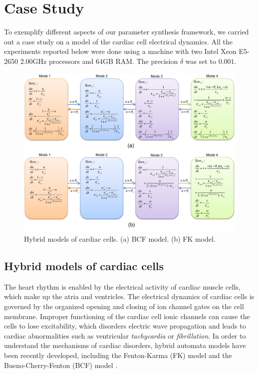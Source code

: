 \section{Case Study}

To exemplify different aspects of our parameter synthesis framework, we carried out a case study on
a model of the cardiac cell electrical dynamics. All the experiments reported below were done
using a machine with two Intel Xeon E5-2650 2.00GHz processors and 64GB RAM. The precision $\delta$
was set to $0.001$.

\begin{figure}[t]
\centering
\includegraphics[scale=0.5]{fig-cardiac-new}
\caption{Hybrid models of cardiac cells. (a) BCF model. (b) FK model.}
\label{model}
\end{figure}

\subsection{Hybrid models of cardiac cells}
The heart rhythm is enabled by the electrical activity of cardiac muscle cells, which make up the atria and ventricles. The electrical dynamics of cardiac cells is governed by the organized opening and closing of ion channel gates on the cell membrane. Improper functioning of the cardiac cell ionic channels can cause the cells to lose excitability, which disorders electric wave propagation and leads to cardiac abnormalities such as ventricular \textit{tachycardia} or \textit{fibrillation}. In order to understand the mechanisms of cardiac disorders,
hybrid automata models have been recently developed, including the Fenton-Karma (FK) model \cite{fenton98} and the Bueno-Cherry-Fenton (BCF) model \cite{orovio08}.

